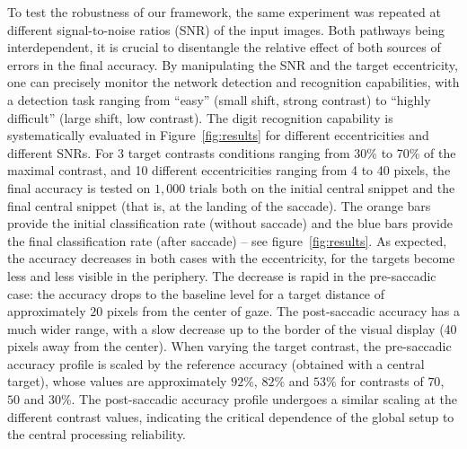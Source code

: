 To test the robustness of our framework, the same experiment was repeated at different signal-to-noise ratios (SNR) of the input images. Both pathways being interdependent, it is crucial to disentangle the relative effect of both sources of errors in the final accuracy. By manipulating the SNR and the target eccentricity, one can precisely monitor the network detection and recognition capabilities, with a detection task ranging from ``easy'' (small shift, strong contrast) to ``highly difficult'' (large shift, low contrast). The digit recognition capability is systematically evaluated in Figure~\ref{fig:results} for different eccentricities and different SNRs.
For 3 target contrasts conditions ranging from 30\% to 70\% of the maximal contrast, and 10 different eccentricities ranging from 4 to 40 pixels, the final accuracy is tested on $1,000$ trials both on the initial central snippet and the final central snippet (that is, at the landing of the saccade).
The orange bars provide the initial classification rate (without saccade) and the blue bars provide the final classification rate (after saccade) -- see figure~\ref{fig:results}. As expected, the accuracy decreases in both cases with the eccentricity, for the targets become less and less visible in the periphery. The decrease is rapid in the pre-saccadic case: the accuracy drops to the baseline level for a target distance of approximately $20$ pixels from the center of gaze. The post-saccadic accuracy has a much wider range, with a slow decrease up to the border of the visual display (40 pixels away from the center).
When varying the target contrast, the pre-saccadic accuracy profile is scaled by the reference accuracy (obtained with a central target), whose values are approximately $92\%$, $82\%$ and $53\%$ for contrasts of $70$, $50$ and $30$\%. The post-saccadic accuracy profile undergoes a similar scaling at the different contrast values, indicating the critical dependence of the global setup to the central processing reliability.


